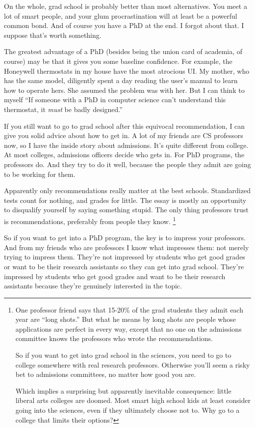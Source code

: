 \documentclass[12pt]{book}
\begin{document}
On the whole, grad school is probably better than most alternatives. You
meet a lot of smart people, and your glum procrastination will at least
be a powerful common bond. And of course you have a PhD at the end. I
forgot about that. I suppose that's worth something.

The greatest advantage of a PhD (besides being the union card of
academia, of course) may be that it gives you some baseline confidence.
For example, the Honeywell thermostats in my house have the most
atrocious UI. My mother, who has the same model, diligently spent a day
reading the user's manual to learn how to operate hers. She assumed the
problem was with her. But I can think to myself ``If someone with a PhD
in computer science can't understand this thermostat, it \emph{must} be
badly designed.''

If you still want to go to grad school after this equivocal
recommendation, I can give you solid advice about how to get in. A lot
of my friends are CS professors now, so I have the inside story about
admissions. It's quite different from college. At most colleges,
admissions officers decide who gets in. For PhD programs, the professors
do. And they try to do it well, because the people they admit are going
to be working for them.

Apparently only recommendations really matter at the best schools.
Standardized tests count for nothing, and grades for little. The essay
is mostly an opportunity to disqualify yourself by saying something
stupid. The only thing professors trust is recommendations, preferably
from people they know. \footnote{One professor friend says that 15-20\% of the grad students they
admit each year are ``long shots.'' But what he means by long shots are
people whose applications are perfect in every way, except that no one
on the admissions committee knows the professors who wrote the
recommendations.

So if you want to get into grad school in the sciences, you need to go
to college somewhere with real research professors. Otherwise you'll
seem a risky bet to admissions committees, no matter how good you are.

Which implies a surprising but apparently inevitable consequence: little
liberal arts colleges are doomed. Most smart high school kids at least
consider going into the sciences, even if they ultimately choose not to.
Why go to a college that limits their options?}

So if you want to get into a PhD program, the key is to impress your
professors. And from my friends who are professors I know what impresses
them: not merely trying to impress them. They're not impressed by
students who get good grades or want to be their research assistants so
they can get into grad school. They're impressed by students who get
good grades and want to be their research assistants because they're
genuinely interested in the topic.
\end{document}
